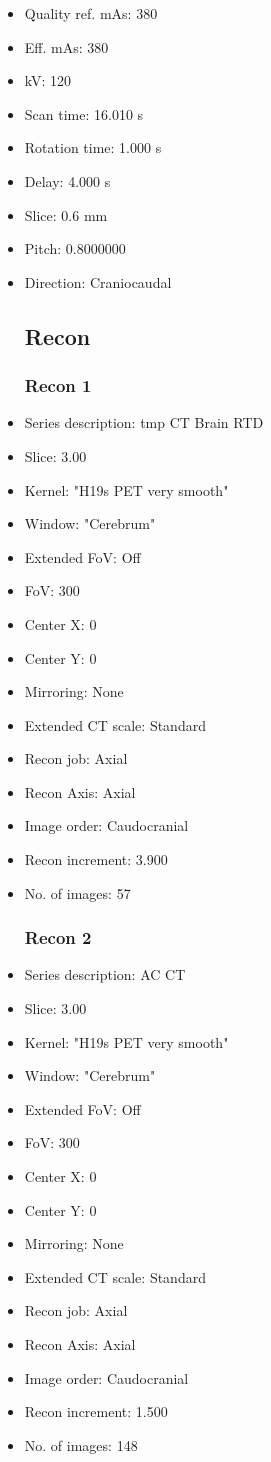 \documentclass[12pt]{article}
\begin{document}
\begin{itemize}
\subsection{Scan}
\item Quality ref. mAs: 380\item Eff. mAs: 380\item kV: 120\item Scan time: 16.010 s\item Rotation time: 1.000 s\item Delay: 4.000 s\item Slice: 0.6 mm\item Pitch: 0.8000000\item Direction: Craniocaudal
\subsection{Recon}

\subsubsection{Recon 1}
\item Series description: tmp CT Brain RTD
\item Slice: 3.00
\item Kernel: "H19s PET very smooth"
\item Window: "Cerebrum"
\item Extended FoV: Off
\item FoV: 300
\item Center X: 0
\item Center Y: 0
\item Mirroring: None
\item Extended CT scale: Standard
\item Recon job: Axial
\item Recon Axis: Axial
\item Image order: Caudocranial
\item Recon increment: 3.900
\item No. of images: 57
\subsubsection{Recon 2}
\item Series description: AC CT
\item Slice: 3.00
\item Kernel: "H19s PET very smooth"
\item Window: "Cerebrum"
\item Extended FoV: Off
\item FoV: 300
\item Center X: 0
\item Center Y: 0
\item Mirroring: None
\item Extended CT scale: Standard
\item Recon job: Axial
\item Recon Axis: Axial
\item Image order: Caudocranial
\item Recon increment: 1.500
\item No. of images: 148

\end{itemize}
\end{document}

